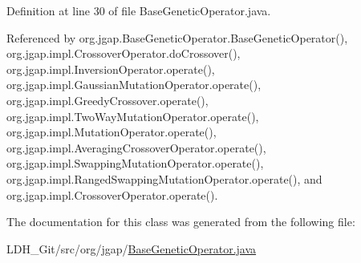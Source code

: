 Definition at line 30 of file Base\-Genetic\-Operator.\-java.



Referenced by org.\-jgap.\-Base\-Genetic\-Operator.\-Base\-Genetic\-Operator(), org.\-jgap.\-impl.\-Crossover\-Operator.\-do\-Crossover(), org.\-jgap.\-impl.\-Inversion\-Operator.\-operate(), org.\-jgap.\-impl.\-Gaussian\-Mutation\-Operator.\-operate(), org.\-jgap.\-impl.\-Greedy\-Crossover.\-operate(), org.\-jgap.\-impl.\-Two\-Way\-Mutation\-Operator.\-operate(), org.\-jgap.\-impl.\-Mutation\-Operator.\-operate(), org.\-jgap.\-impl.\-Averaging\-Crossover\-Operator.\-operate(), org.\-jgap.\-impl.\-Swapping\-Mutation\-Operator.\-operate(), org.\-jgap.\-impl.\-Ranged\-Swapping\-Mutation\-Operator.\-operate(), and org.\-jgap.\-impl.\-Crossover\-Operator.\-operate().



The documentation for this class was generated from the following file\-:\begin{DoxyCompactItemize}
\item 
L\-D\-H\-\_\-\-Git/src/org/jgap/\hyperlink{_base_genetic_operator_8java}{Base\-Genetic\-Operator.\-java}\end{DoxyCompactItemize}
